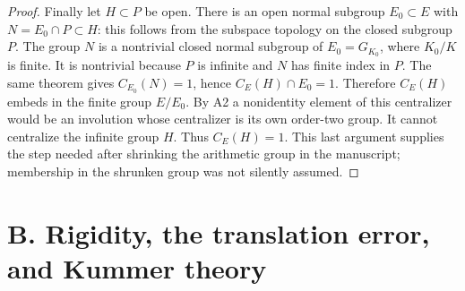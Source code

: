 \begin{proof}
Finally let $H\subset P$ be open. There is an open normal subgroup
$E_0\subset E$ with $N=E_0\cap P\subset H$: this follows from the
subspace topology on the closed subgroup $P$. The group $N$ is a
nontrivial closed normal subgroup of $E_0=G_{K_0}$, where $K_0/K$ is
finite. It is nontrivial because $P$ is infinite and $N$ has finite index
in $P$. The same theorem gives $C_{E_0}(N)=1$, hence
$C_E(H)\cap E_0=1$. Therefore $C_E(H)$ embeds in the finite group
$E/E_0$. By A2 a nonidentity element of this centralizer would be an
involution whose centralizer is its own order-two group. It cannot
centralize the infinite group $H$. Thus $C_E(H)=1$.
This last argument supplies the step needed after shrinking the
arithmetic group in the manuscript; membership in the shrunken group
was not silently assumed.
\end{proof}

\section{B. Rigidity, the translation error, and Kummer theory}

